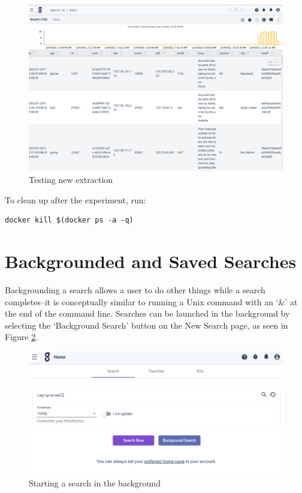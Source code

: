 \begin{figure}
	\includegraphics[width=0.8\linewidth]{images/lab-test-ax.png}
	\caption{Testing new extraction}
	\label{fig:lab-test-ax}
\end{figure}

To clean up after the experiment, run:

\begin{Verbatim}[breaklines=true]
docker kill $(docker ps -a -q)
\end{Verbatim}


\clearpage
\section{Backgrounded and Saved Searches}
Backgrounding a search allows a user to do other things while a search
completes--it is conceptually similar to running a Unix command with
an `\&' at the end of the command line. Searches can be launched in the
background by selecting the `Background Search' button on the New Search
page, as seen in Figure \ref{fig:bg-new-search}.


\begin{figure}
	\includegraphics[width=0.8\linewidth]{images/bg-new-search.png}
	\caption{Starting a search in the background}
	\label{fig:bg-new-search}
\end{figure}

